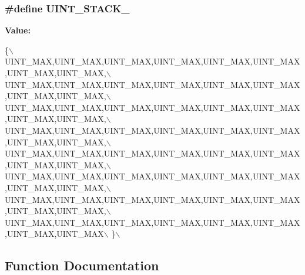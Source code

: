 \subsubsection[{\texorpdfstring{U\+I\+N\+T\+\_\+\+S\+T\+A\+C\+K\+\_\+64}{UINT_STACK_64}}]{\setlength{\rightskip}{0pt plus 5cm}\#define U\+I\+N\+T\+\_\+\+S\+T\+A\+C\+K\+\_}\hypertarget{group__g15_ga15c2960be78430ff97fdd8ba8a9329ca}{}\label{group__g15_ga15c2960be78430ff97fdd8ba8a9329ca}
{\bfseries Value\+:}
\begin{DoxyCode}
\{\(\backslash\)
        UINT\_MAX,UINT\_MAX,UINT\_MAX,UINT\_MAX,UINT\_MAX,UINT\_MAX,UINT\_MAX,UINT\_MAX,\(\backslash\)
        UINT\_MAX,UINT\_MAX,UINT\_MAX,UINT\_MAX,UINT\_MAX,UINT\_MAX,UINT\_MAX,UINT\_MAX,\(\backslash\)
        UINT\_MAX,UINT\_MAX,UINT\_MAX,UINT\_MAX,UINT\_MAX,UINT\_MAX,UINT\_MAX,UINT\_MAX,\(\backslash\)
        UINT\_MAX,UINT\_MAX,UINT\_MAX,UINT\_MAX,UINT\_MAX,UINT\_MAX,UINT\_MAX,UINT\_MAX,\(\backslash\)
        UINT\_MAX,UINT\_MAX,UINT\_MAX,UINT\_MAX,UINT\_MAX,UINT\_MAX,UINT\_MAX,UINT\_MAX,\(\backslash\)
        UINT\_MAX,UINT\_MAX,UINT\_MAX,UINT\_MAX,UINT\_MAX,UINT\_MAX,UINT\_MAX,UINT\_MAX,\(\backslash\)
        UINT\_MAX,UINT\_MAX,UINT\_MAX,UINT\_MAX,UINT\_MAX,UINT\_MAX,UINT\_MAX,UINT\_MAX,\(\backslash\)
        UINT\_MAX,UINT\_MAX,UINT\_MAX,UINT\_MAX,UINT\_MAX,UINT\_MAX,UINT\_MAX,UINT\_MAX\(\backslash\)
    \}\(\backslash\)
\end{DoxyCode}


\subsection{Function Documentation}
